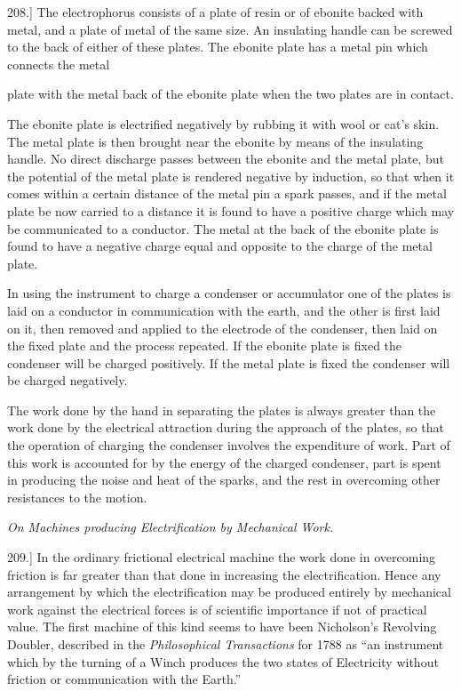 \documentclass[11pt,a4paper]{article}
\begin{document}
208.] The electrophorus consists of a plate of resin or of ebonite backed
with metal, and a plate of metal of the same size. An insulating handle
can be screwed to the back of either of these plates. The ebonite plate
has a metal pin which connects the metal

plate with the metal back of the ebonite plate when the two plates are in
contact.

The ebonite plate is electrified negatively by rubbing it with wool or
cat's skin. The metal plate is then brought near the ebonite by means of
the insulating handle. No direct discharge passes between the ebonite and
the metal plate, but the potential of the metal plate is rendered
negative by induction, so that when it comes within a certain distance of
the metal pin a spark passes, and if the metal plate be now carried to a
distance it is found to have a positive charge which may be communicated
to a conductor. The metal at the back of the ebonite plate is found to
have a negative charge equal and opposite to the charge of the metal
plate.

In using the instrument to charge a condenser or accumulator one of the
plates is laid on a conductor in communication with the earth, and the
other is first laid on it, then removed and applied to the electrode of
the condenser, then laid on the fixed plate and the process repeated. If
the ebonite plate is fixed the condenser will be charged positively. If
the metal plate is fixed the condenser will be charged negatively.

The work done by the hand in separating the plates is always greater
than the work done by the electrical attraction during the approach of
the plates, so that the operation of charging the condenser involves the
expenditure of work. Part of this work is accounted for by the energy of
the charged condenser, part is spent in producing the noise and heat of
the sparks, and the rest in overcoming other resistances to the motion.

\begin{center}
\textit{On Machines producing Electrification by Mechanical Work.}
\end{center}

209.] In the ordinary frictional electrical machine the work done in
overcoming friction is far greater than that done in increasing the
electrification. Hence any arrangement by which the electrification may
be produced entirely by mechanical work against the electrical forces is
of scientific importance if not of practical value. The first machine of
this kind seems to have been Nicholson's Revolving Doubler, described in
the \textit{Philosophical Transactions} for 1788 as ``an instrument
which by the turning of a Winch produces the two states of Electricity
without friction or communication with the Earth.''
\end{document}
